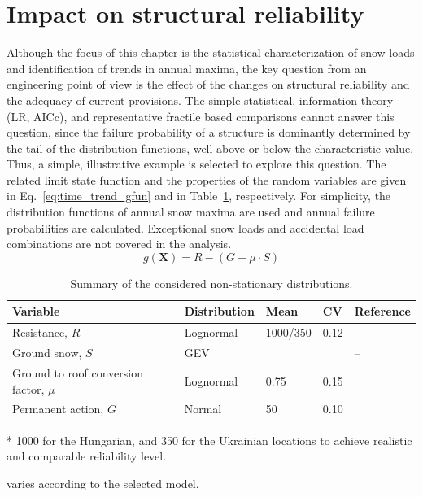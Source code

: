 \section{Impact on structural reliability}

Although the focus of this chapter is the statistical characterization of snow loads and identification of trends in annual maxima, the key question from an engineering point  of view is the effect of the changes on structural reliability and the adequacy of current provisions. The simple statistical, information theory (LR, AICc), and representative fractile based comparisons cannot answer this question, since the failure probability of a structure is dominantly determined by the tail of the distribution functions, well above or below the characteristic value. Thus, a simple, illustrative example is selected to explore this question. The related limit state function and the properties of the random variables are given in Eq.~\ref{eq:time_trend_gfun} and in Table~\ref{tab:time_trend_probmod}, respectively. For simplicity, the distribution functions of annual snow maxima are used and annual failure probabilities are calculated. Exceptional snow loads and accidental load combinations are not covered in the analysis.
\begin{equation}
\label{eq:time_trend_gfun}
	g(\mathbf{X}) = R - \left( {G + \mu  \cdot S } \right)
\end{equation}


\begin{table}[htbp!]
\caption{Summary of the considered non-stationary distributions.}
\centering
\label{tab:time_trend_probmod}
\small
	\begin{threeparttable}
    \begin{tabular}{lllll}
    \toprule
    Variable  & Distribution & Mean & CV & Reference \\
    \midrule
    \rowcolor{lightgrey} Resistance, $R$  & Lognormal & 1000/350\tnote{*} & 0.12  & \cite{JCSS_resi}  \\
    Ground snow, $S$ & GEV & \tnote{\textdagger} & \tnote{\textdagger}  & --  \\
    \rowcolor{lightgrey} Ground to roof conversion factor, $\mu$  & Lognormal & 0.75 & 0.15  & \cite{JCSS_load}  \\
    Permanent action, $G$  & Normal & 50 & 0.10  & \cite{JCSS_load}  \\
    \bottomrule
    \end{tabular}
    \begin{tablenotes}
    	\item[*] 1000 for the Hungarian, and 350 for the Ukrainian locations to achieve realistic and comparable reliability level.
	    \item[\textdagger] varies according to the selected model.  
   	\end{tablenotes}
   	\end{threeparttable}
\end{table}


